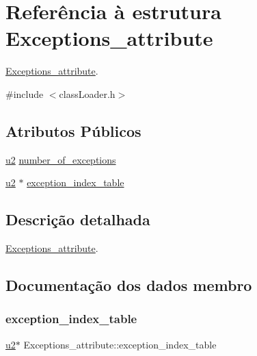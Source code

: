 \hypertarget{struct_exceptions__attribute}{}\section{Referência à estrutura Exceptions\+\_\+attribute}
\label{struct_exceptions__attribute}


\hyperlink{struct_exceptions__attribute}{Exceptions\+\_\+attribute}.  




{\ttfamily \#include $<$class\+Loader.\+h$>$}

\subsection*{Atributos Públicos}
\begin{DoxyCompactItemize}
\item 
\hyperlink{util_8h_a55ef8d87fd202b8417704c089899c5b9}{u2} \hyperlink{struct_exceptions__attribute_af9f38fbc43eadcb56658f90e8743c90b}{number\+\_\+of\+\_\+exceptions}
\item 
\hyperlink{util_8h_a55ef8d87fd202b8417704c089899c5b9}{u2} $\ast$ \hyperlink{struct_exceptions__attribute_a85a01c4ef477cf86cd0dc099eee2b08d}{exception\+\_\+index\+\_\+table}
\end{DoxyCompactItemize}


\subsection{Descrição detalhada}
\hyperlink{struct_exceptions__attribute}{Exceptions\+\_\+attribute}. 

\subsection{Documentação dos dados membro}
\mbox{\label{struct_exceptions__attribute_a85a01c4ef477cf86cd0dc099eee2b08d}} 
\subsubsection{\texorpdfstring{exception\+\_\+index\+\_\+table}{exception\_index\_table}}
{\footnotesize\ttfamily \hyperlink{util_8h_a55ef8d87fd202b8417704c089899c5b9}{u2}$\ast$ Exceptions\+\_\+attribute\+::exception\+\_\+index\+\_\+table}

